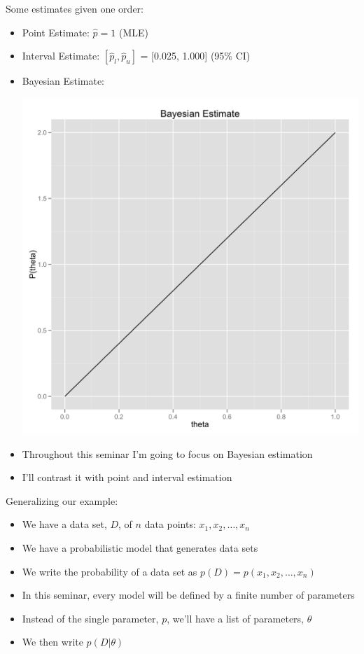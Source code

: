 \documentclass{beamer}
\begin{document}
\frame
{
 Some estimates given one order:
 \begin{itemize}
   \item{Point Estimate: $\hat{p} = 1$ (MLE)}
   \item{Interval Estimate: $[\hat{p}_{l}, \hat{p}_{u}]$ = [0.025, 1.000] (95\% CI)}
   \item{Bayesian Estimate:}
   \begin{center}
     \includegraphics[scale = 0.075]{sample_beta.png}
    \end{center}
 \end{itemize}
}

\frame
{
  \begin{itemize}
    \item{Throughout this seminar I'm going to focus on Bayesian estimation}
    \item{I'll contrast it with point and interval estimation}
  \end{itemize}
}

\frame
{
  Generalizing our example:
  \begin{itemize}
    \item{We have a data set, $D$, of $n$ data points: $x_1, x_2, \ldots, x_n$}
    \item{We have a probabilistic model that generates data sets}
    \item{We write the probability of a data set as $p(D) = p(x_1, x_2, \ldots, x_n)$}
    \item{In this seminar, every model will be defined by a finite number of parameters}
    \item{Instead of the single parameter, $p$, we'll have a list of parameters, $\theta$}
    \item{We then write $p(D | \theta)$}
  \end{itemize}
}
\end{document}

